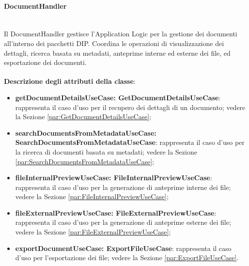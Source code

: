 \documentclass[a4paper,12pt]{article}
\begin{document}
{{                \paragraph{DocumentHandler}\label{par:DocumentHandler}\mbox{}\\
                Il DocumentHandler gestisce l'Application Logic per la gestione dei documenti all'interno dei pacchetti DIP. Coordina le operazioni di visualizzazione dei dettagli, ricerca basata su metadati, anteprime interne ed esterne dei file, ed esportazione dei documenti.\\
                \\
                \textbf{Descrizione degli attributi della classe}:
                \begin{itemize}
                    \item \textbf{getDocumentDetailsUseCase: GetDocumentDetailsUseCase}: rappresenta il caso d'uso per il recupero dei dettagli di un documento; vedere la Sezione \ref{par:GetDocumentDetailsUseCase};
                    \item \textbf{searchDocumentsFromMetadataUseCase:\\ SearchDocumentsFromMetadataUseCase}: rappresenta il caso d'uso per la ricerca di documenti basata su metadati; vedere la Sezione \ref{par:SearchDocumentsFromMetadataUseCase};
                    \item \textbf{fileInternalPreviewUseCase: FileInternalPreviewUseCase}: rappresenta il caso d'uso per la generazione di anteprime interne dei file; vedere la Sezione \ref{par:FileInternalPreviewUseCase};
                    \item \textbf{fileExternalPreviewUseCase: FileExternalPreviewUseCase}: rappresenta il caso d'uso per la generazione di anteprime esterne dei file; vedere la Sezione \ref{par:FileExternalPreviewUseCase};
                    \item \textbf{exportDocumentUseCase: ExportFileUseCase}: rappresenta il caso d'uso per l'esportazione dei file; vedere la Sezione \ref{par:ExportFileUseCase}.
                \end{itemize}
            
}}
\end{document}

